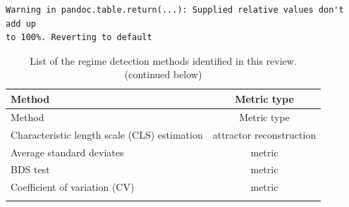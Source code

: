 \documentclass[12pt,twoside,openany]{reedthesis}
\begin{document}
\begin{verbatim}
Warning in pandoc.table.return(...): Supplied relative values don't add up
to 100%. Reverting to default
\end{verbatim}
\begin{longtable}[]{@{}lc@{}}
\caption{List of the regime detection methods identified in this review. (continued below)}\tabularnewline
\toprule
\begin{minipage}[b]{0.43\columnwidth}\raggedright
Method\strut
\end{minipage} & \begin{minipage}[b]{0.35\columnwidth}\centering
Metric type\strut
\end{minipage}\tabularnewline
\midrule
\endfirsthead
\toprule
\begin{minipage}[b]{0.43\columnwidth}\raggedright
Method\strut
\end{minipage} & \begin{minipage}[b]{0.35\columnwidth}\centering
Metric type\strut
\end{minipage}\tabularnewline
\midrule
\endhead
\begin{minipage}[t]{0.43\columnwidth}\raggedright
Characteristic length scale
(CLS) estimation\strut
\end{minipage} & \begin{minipage}[t]{0.35\columnwidth}\centering
attractor reconstruction\strut
\end{minipage}\tabularnewline
\begin{minipage}[t]{0.43\columnwidth}\raggedright
Average standard deviates\strut
\end{minipage} & \begin{minipage}[t]{0.35\columnwidth}\centering
metric\strut
\end{minipage}\tabularnewline
\begin{minipage}[t]{0.43\columnwidth}\raggedright
BDS test\strut
\end{minipage} & \begin{minipage}[t]{0.35\columnwidth}\centering
metric\strut
\end{minipage}\tabularnewline
\begin{minipage}[t]{0.43\columnwidth}\raggedright
Coefficient of variation (CV)\strut
\end{minipage} & \begin{minipage}[t]{0.35\columnwidth}\centering
metric\strut
\end{minipage}\tabularnewline
\begin{minipage}[t]{0.43\columnwidth}\raggedright

\end{minipage}
\end{longtable}
\end{document}
